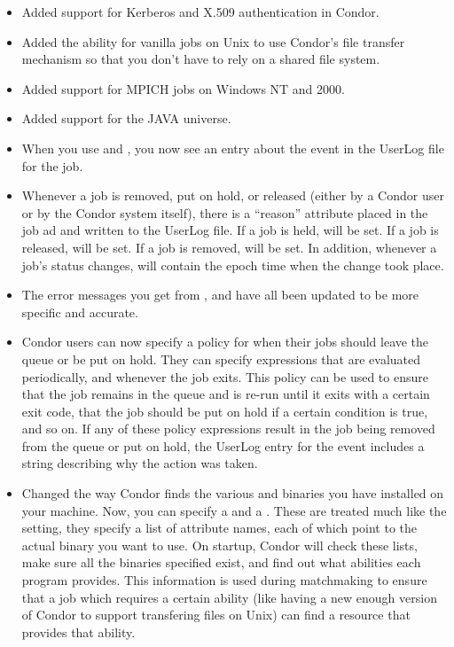 \begin{itemize}

\item Added support for Kerberos and X.509 authentication in Condor.  

\item Added the ability for vanilla jobs on Unix to use Condor's file
transfer mechanism so that you don't have to rely on a shared file
system.  

\item Added support for MPICH jobs on Windows NT and 2000.

\item Added support for the JAVA universe.

\item When you use  and , you now see an
entry about the event in the UserLog file for the job.

\item Whenever a job is removed, put on hold, or released (either by a
Condor user or by the Condor system itself), there is a ``reason''
attribute placed in the job ad and written to the UserLog file.  
If a job is held,  will be set.
If a job is released,  will be set.
If a job is removed,  will be set.
In addition, whenever a job's status changes,
 will contain the epoch time when the
change took place.

\item The error messages you get from ,  and
 have all been updated to be more specific and
accurate. 

\item Condor users can now specify a policy for when their jobs should
leave the queue or be put on hold.
They can specify expressions that are evaluated periodically, and
whenever the job exits.
This policy can be used to ensure that the job remains in the queue
and is re-run until it exits with a certain exit code, that the job
should be put on hold if a certain condition is true, and so on. 
If any of these policy expressions result in the job being removed
from the queue or put on hold, the UserLog entry for the event
includes a string describing why the action was taken.

\item Changed the way Condor finds the various  and
 binaries you have installed on your machine.
Now, you can specify a  and a
.
These are treated much like the  setting, they
specify a list of attribute names, each of which point to the actual
binary you want to use.
On startup, Condor will check these lists, make sure all the binaries
specified exist, and find out what abilities each program provides.
This information is used during matchmaking to ensure that a job which
requires a certain ability (like having a new enough version of Condor
to support transfering files on Unix) can find a resource that
provides that ability.


\end{itemize}
